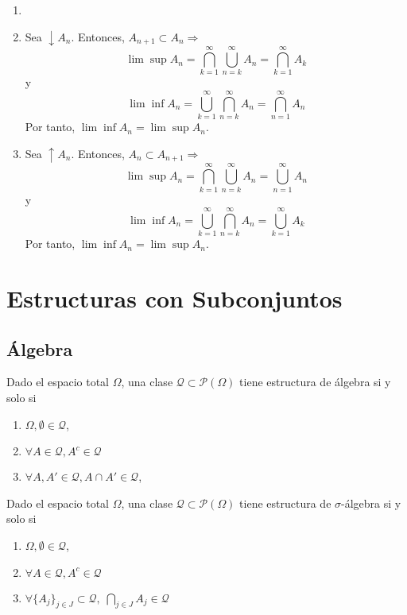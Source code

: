 \begin{dem}
  \begin{enumerate}[label=(\roman*)]
    \item []
    \item Sea $\downarrow A_{n}$. Entonces, $A_{n+1} \subset A_{n} \Rightarrow$
      \[
         \lim \sup A_n = \bigcap_{k=1}^{\infty} \bigcup_{n=k}^{\infty} A_{n} = \bigcap_{k = 1}^{\infty} A_{k}
      \]
      y
      \[
        \lim \inf A_n = \bigcup_{k=1}^{\infty} \bigcap_{n=k}^{\infty} A_{n} = \bigcap_{n = 1}^{\infty} A_{n}
      \]
      Por tanto, $\lim \inf A_n  = \lim \sup A_n$.
    \item Sea $\uparrow A_{n}$. Entonces, $A_{n} \subset A_{n + 1} \Rightarrow$
      \[
         \lim \sup A_n = \bigcap_{k=1}^{\infty} \bigcup_{n=k}^{\infty} A_{n} = \bigcup_{n = 1}^{\infty} A_{n}
      \]
      y
      \[
        \lim \inf A_n = \bigcup_{k=1}^{\infty} \bigcap_{n=k}^{\infty} A_{n} = \bigcup_{k = 1}^{\infty} A_{k}
      \]
      Por tanto, $\lim \inf A_n  = \lim \sup A_n$.
 
  \end{enumerate}
\end{dem}

\section{Estructuras con Subconjuntos}

\subsection{Álgebra}

\begin{defn}[Álgebra]
  Dado el espacio total $\Omega$, una clase $\mathcal{Q} \subset \mathcal{P}(\Omega)$ tiene estructura de álgebra si y solo si
  \begin{enumerate}[label=(\roman*)]
    \item $\Omega, \emptyset \in \mathcal{Q}$,
    \item $\forall A \in \mathcal{Q}, A^{c} \in \mathcal{Q}$
    \item $\forall A, A' \in \mathcal{Q}, A \cap A' \in \mathcal{Q}$,
  \end{enumerate}
\end{defn}

\begin{defn}
  Dado el espacio total $\Omega$, una clase $\mathcal{Q} \subset \mathcal{P}(\Omega)$ tiene estructura de $\sigma$-álgebra si y solo si
  \begin{enumerate}[label=(\roman*)]
    \item $\Omega, \emptyset \in \mathcal{Q}$,
    \item $\forall A \in \mathcal{Q}, A^{c} \in \mathcal{Q}$
    \item $\forall \{ A_{j} \}_{j \in J} \subset \mathcal{Q}, \; \bigcap_{j \in J} A_{j} \in \mathcal{Q}$
  \end{enumerate}
\end{defn}


